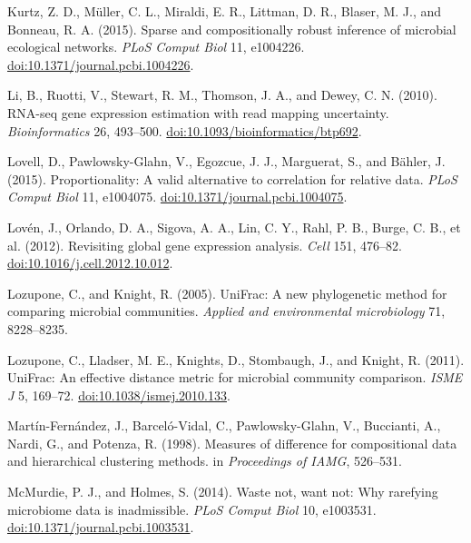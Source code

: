 \documentclass[twocolumn]{article}
\begin{document}
Kurtz, Z. D., Müller, C. L., Miraldi, E. R., Littman, D. R., Blaser, M.
J., and Bonneau, R. A. (2015). Sparse and compositionally robust
inference of microbial ecological networks. \emph{PLoS Comput Biol} 11,
e1004226.
\href{http://doi.org/10.1371/journal.pcbi.1004226}{doi:10.1371/journal.pcbi.1004226}.

Li, B., Ruotti, V., Stewart, R. M., Thomson, J. A., and Dewey, C. N.
(2010). RNA-seq gene expression estimation with read mapping
uncertainty. \emph{Bioinformatics} 26, 493--500.
\href{http://doi.org/10.1093/bioinformatics/btp692}{doi:10.1093/bioinformatics/btp692}.

Lovell, D., Pawlowsky-Glahn, V., Egozcue, J. J., Marguerat, S., and
Bähler, J. (2015). Proportionality: A valid alternative to correlation
for relative data. \emph{PLoS Comput Biol} 11, e1004075.
\href{http://doi.org/10.1371/journal.pcbi.1004075}{doi:10.1371/journal.pcbi.1004075}.

Lovén, J., Orlando, D. A., Sigova, A. A., Lin, C. Y., Rahl, P. B.,
Burge, C. B., et al. (2012). Revisiting global gene expression analysis.
\emph{Cell} 151, 476--82.
\href{http://doi.org/10.1016/j.cell.2012.10.012}{doi:10.1016/j.cell.2012.10.012}.

Lozupone, C., and Knight, R. (2005). UniFrac: A new phylogenetic method
for comparing microbial communities. \emph{Applied and environmental
microbiology} 71, 8228--8235.

Lozupone, C., Lladser, M. E., Knights, D., Stombaugh, J., and Knight, R.
(2011). UniFrac: An effective distance metric for microbial community
comparison. \emph{ISME J} 5, 169--72.
\href{http://doi.org/10.1038/ismej.2010.133}{doi:10.1038/ismej.2010.133}.

Martín-Fernández, J., Barceló-Vidal, C., Pawlowsky-Glahn, V., Buccianti,
A., Nardi, G., and Potenza, R. (1998). Measures of difference for
compositional data and hierarchical clustering methods. in
\emph{Proceedings of IAMG}, 526--531.

McMurdie, P. J., and Holmes, S. (2014). Waste not, want not: Why
rarefying microbiome data is inadmissible. \emph{PLoS Comput Biol} 10,
e1003531.
\href{http://doi.org/10.1371/journal.pcbi.1003531}{doi:10.1371/journal.pcbi.1003531}.
\end{document}
